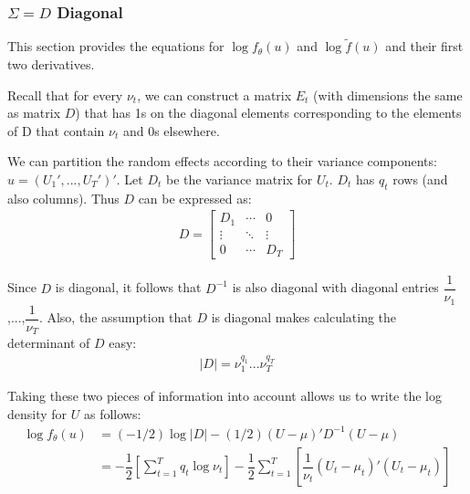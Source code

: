 \documentclass{article}
\begin{document}
\subsubsection{$\Sigma=D$ Diagonal}\label{sec:Ddiag}
This section provides the equations for $\log f_\theta(u)$ and  $\log \tilde{f}(u)$ and their first two derivatives.

 Recall that for every $\nu_t$, we can construct a matrix $E_t$ (with dimensions the same as matrix $D$) that has 1s on the diagonal elements corresponding to the elements of D that contain $\nu_t$ and 0s  elsewhere.  

We can partition the random effects according to their variance components: $u=(U_1',...,U_T')'$.  Let $D_t$ be the variance matrix for $U_t$. $D_t$ has $q_t$ rows (and also columns). Thus $D$ can be expressed as:
\begin{align}
D = \begin{bmatrix} D_1 & \cdots & 0 \\ \vdots & \ddots & \vdots \\ 0 & \cdots & D_T \end{bmatrix}
\end{align}

Since $D$ is diagonal, it follows that $D^{-1}$ is also diagonal with diagonal entries $\dfrac{1}{\nu_1}$,...,$\dfrac{1}{\nu_T}$.  Also, the assumption that $D$ is diagonal makes calculating the determinant of $D$  easy:
\begin{align}
|D|= \nu_1^{q_1}...\nu_T^{q_T}
\end{align}

 Taking these two pieces of information into account allows us to write the log density for $U$ as follows:
\begin{align}
\log f_\theta(u) &= (-1/2) \log |D| - (1/2) (U-\mu)' D^{-1} (U-\mu)\\
&= -\dfrac{1}{2} \left[  \sum_{t=1}^T q_t \log \nu_t   \right]  -\dfrac{1}{2} \sum_{t=1}^T \left[ \dfrac{1}{\nu_t} (U_t-\mu_t)'(U_t-\mu_t)   \right]
\end{align}





\end{document}
